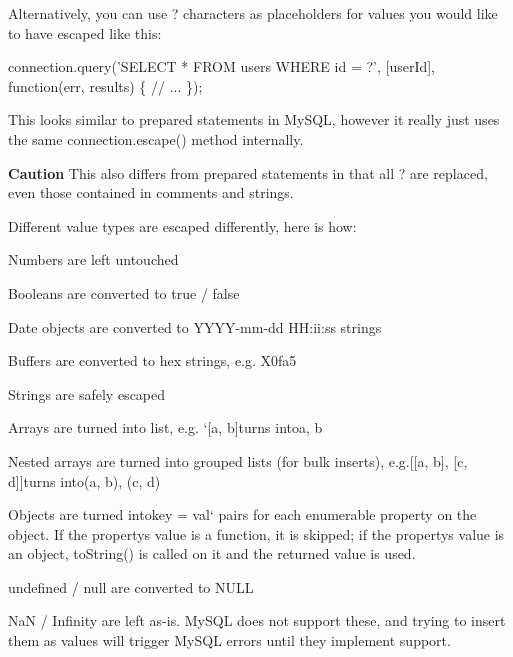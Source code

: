 Alternatively, you can use {\ttfamily ?} characters as placeholders for values you would like to have escaped like this\+:


\begin{DoxyCode}
connection.query(\textcolor{stringliteral}{'SELECT * FROM users WHERE id = ?'}, [userId], \textcolor{keyword}{function}(err, results) \{
  \textcolor{comment}{// ...}
\});
\end{DoxyCode}


This looks similar to prepared statements in My\+S\+Q\+L, however it really just uses the same {\ttfamily connection.\+escape()} method internally.

{\bfseries Caution} This also differs from prepared statements in that all {\ttfamily ?} are replaced, even those contained in comments and strings.

Different value types are escaped differently, here is how\+:


\begin{DoxyItemize}
\item Numbers are left untouched
\item Booleans are converted to {\ttfamily true} / {\ttfamily false}
\item Date objects are converted to {\ttfamily \textquotesingle{}Y\+Y\+Y\+Y-\/mm-\/dd H\+H\+:ii\+:ss\textquotesingle{}} strings
\item Buffers are converted to hex strings, e.\+g. {\ttfamily X\textquotesingle{}0fa5\textquotesingle{}}
\item Strings are safely escaped
\item Arrays are turned into list, e.\+g. `\mbox{[}\textquotesingle{}a\textquotesingle{}, \textquotesingle{}b\textquotesingle{}\mbox{]}{\ttfamily turns into}\textquotesingle{}a\textquotesingle{}, \textquotesingle{}b\textquotesingle{}{\ttfamily }
\item {\ttfamily Nested arrays are turned into grouped lists (for bulk inserts), e.\+g.}\mbox{[}\mbox{[}\textquotesingle{}a\textquotesingle{}, \textquotesingle{}b\textquotesingle{}\mbox{]}, \mbox{[}\textquotesingle{}c\textquotesingle{}, \textquotesingle{}d\textquotesingle{}\mbox{]}\mbox{]}{\ttfamily turns into}(\textquotesingle{}a\textquotesingle{}, \textquotesingle{}b\textquotesingle{}), (\textquotesingle{}c\textquotesingle{}, \textquotesingle{}d\textquotesingle{}){\ttfamily }
\item {\ttfamily Objects are turned into}key = \textquotesingle{}val\textquotesingle{}` pairs for each enumerable property on the object. If the property\textquotesingle{}s value is a function, it is skipped; if the property\textquotesingle{}s value is an object, to\+String() is called on it and the returned value is used.
\item {\ttfamily undefined} / {\ttfamily null} are converted to {\ttfamily N\+U\+L\+L}
\item {\ttfamily Na\+N} / {\ttfamily Infinity} are left as-\/is. My\+S\+Q\+L does not support these, and trying to insert them as values will trigger My\+S\+Q\+L errors until they implement support.
\end{DoxyItemize}


